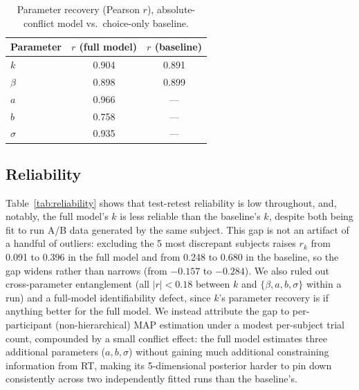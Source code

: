 \documentclass[11pt,a4paper]{article}
\begin{document}
	\begin{table}[htbp]
		\centering
		\begin{tabular}{lcc}
			\toprule
			Parameter & $r$ (full model) & $r$ (baseline) \\
			\midrule
			$k$ & 0.904 & 0.891 \\
			$\beta$ & 0.898 & 0.899 \\
			$a$ & 0.966 & — \\
			$b$ & 0.758 & — \\
			$\sigma$ & 0.935 & — \\
			\bottomrule
		\end{tabular}
		\caption{Parameter recovery (Pearson $r$), absolute-conflict model vs.\ choice-only baseline.}
		\label{tab:recovery}
	\end{table}
	
	\subsection{Reliability}
	
	Table~\ref{tab:reliability} shows that test-retest reliability is low throughout, and, notably, the full model's $k$ is less reliable than the baseline's $k$, despite both being fit to run A/B data generated by the same subject.
	This gap is not an artifact of a handful of outliers: excluding the 5 most discrepant subjects raises $r_k$ from 0.091 to 0.396 in the full model and from 0.248 to 0.680 in the baseline, so the gap widens rather than narrows (from $-0.157$ to $-0.284$). We also ruled out cross-parameter entanglement (all $|r|<0.18$ between $k$ and $\{\beta,a,b,\sigma\}$ within a run) and a full-model identifiability defect, since $k$'s parameter recovery is if anything better for the full model.
	We instead attribute the gap to per-participant (non-hierarchical) MAP estimation under a modest per-subject trial count, compounded by a small conflict effect: the full model estimates three additional parameters ($a,b,\sigma$) without gaining much additional constraining information from RT, making its 5-dimensional posterior harder to pin down consistently across two independently fitted runs than the baseline's.
	
\end{document}
